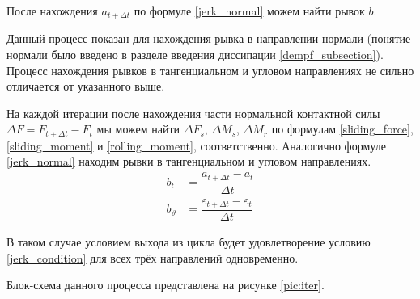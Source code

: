 \documentclass[utf8x, 14pt, oneside, a4paper]{article}
\begin{document}
После нахождения $a_{t + \Delta t}$ по формуле \ref{jerk_normal} можем найти рывок $b$.

Данный процесс показан для нахождения рывка в направлении нормали (понятие нормали было введено в разделе введения  диссипации \ref{dempf_subsection}). 
Процесс нахождения рывков в тангенциальном и угловом направлениях не сильно отличается от указанного выше.

На каждой итерации после нахождения части нормальной контактной силы $\Delta F = F_{t+\Delta t} - F_t$  мы можем найти $\Delta F_s$, $\Delta M_s$, $\Delta M_r$ по формулам \ref{sliding_force}, \ref{sliding_moment} и \ref{rolling_moment}, соответственно.
Аналогично формуле \ref{jerk_normal} находим рывки в тангенциальном и угловом направлениях.
\begin{align}
b_t &= \dfrac{a_{t + \Delta t} - a_{t}}{\Delta t} \label{jerk_tangent}\\
b_{\vartheta} &= \dfrac{\varepsilon_{t + \Delta t} - \varepsilon_{t}}{\Delta t} \label{jerk_angular}
\end{align}

В таком случае условием выхода из цикла будет удовлетворение условию \ref{jerk_condition} для всех трёх направлений одновременно.

Блок-схема данного процесса представлена на рисунке \ref{pic:iter}.
\end{document}
